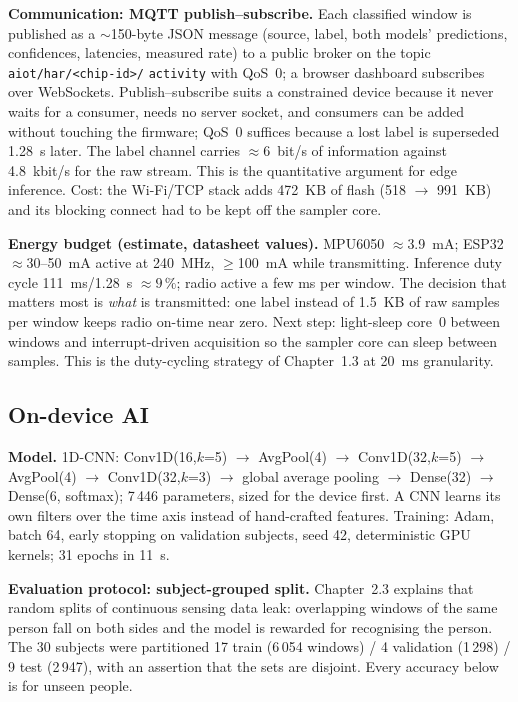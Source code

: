 \documentclass[10pt,a4paper]{article}
\begin{document}
\textbf{Communication: MQTT publish--subscribe.} Each classified window is published as a $\sim$150-byte JSON message (source, label, both models' predictions, confidences, latencies, measured rate) to a public broker on the topic \texttt{aiot/har/<chip-id>/} \texttt{activity} with QoS~0; a browser dashboard subscribes over WebSockets. Publish--subscribe suits a constrained device because it never waits for a consumer, needs no server socket, and consumers can be added without touching the firmware; QoS~0 suffices because a lost label is superseded \SI{1.28}{s} later. The label channel carries $\approx$\SI{6}{bit/s} of information against \SI{4.8}{kbit/s} for the raw stream. This is the quantitative argument for edge inference. Cost: the Wi-Fi/TCP stack adds \SI{472}{KB} of flash (518 $\rightarrow$ \SI{991}{KB}) and its blocking connect had to be kept off the sampler core.

\textbf{Energy budget (estimate, datasheet values).} MPU6050 $\approx$\SI{3.9}{mA}; ESP32 $\approx$30--\SI{50}{mA} active at \SI{240}{MHz}, $\geq$\SI{100}{mA} while transmitting. Inference duty cycle \SI{111}{ms}/\SI{1.28}{s} $\approx 9\,\%$; radio active a few ms per window. The decision that matters most is \emph{what} is transmitted: one label instead of \SI{1.5}{KB} of raw samples per window keeps radio on-time near zero. Next step: light-sleep core~0 between windows and interrupt-driven acquisition so the sampler core can sleep between samples. This is the duty-cycling strategy of Chapter~1.3 at \SI{20}{ms} granularity.

\subsection{On-device AI}\label{sec:ai}

\textbf{Model.} 1D-CNN: Conv1D(16,$k$=5) $\rightarrow$ AvgPool(4) $\rightarrow$ Conv1D(32,$k$=5) $\rightarrow$ AvgPool(4) $\rightarrow$ Conv1D(32,$k$=3) $\rightarrow$ global average pooling $\rightarrow$ Dense(32) $\rightarrow$ Dense(6, softmax); 7\,446 parameters, sized for the device first. A CNN learns its own filters over the time axis instead of hand-crafted features. Training: Adam, batch 64, early stopping on validation subjects, seed 42, deterministic GPU kernels; 31 epochs in \SI{11}{s}.

\textbf{Evaluation protocol: subject-grouped split.} Chapter~2.3 explains that random splits of continuous sensing data leak: overlapping windows of the same person fall on both sides and the model is rewarded for recognising the person. The 30 subjects were partitioned 17 train (6\,054 windows) / 4 validation (1\,298) / 9 test (2\,947), with an assertion that the sets are disjoint. Every accuracy below is for unseen people.
\end{document}
